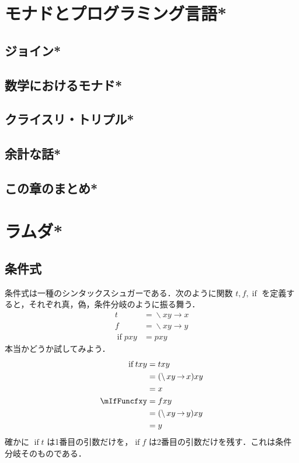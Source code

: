 \documentclass[a4paper,twocolumn]{jsbook}
\DeclareMathOperator{\mIfFunc}{if}
\DeclareMathOperator{\mLambda}{\backslash}
\DeclareMathOperator{\mLambdaArrow}{\rightarrow}
\newcommand{\mLambdaExp}[2]{\mLambda{#1}\mLambdaArrow{#2}}
\begin{document}


\chapter{モナドとプログラミング言語*}

\section{ジョイン*}

\section{数学におけるモナド*}

\section{クライスリ・トリプル*}

\section{余計な話*}

\section{この章のまとめ*}

\chapter{ラムダ*}

\section{条件式}

条件式は一種のシンタックスシュガーである．次のように関数 $t,f,\mIfFunc$ を定義すると，それぞれ真，偽，条件分岐のように振る舞う．
\begin{align}
t&=\mLambdaExp{xy}{x}\\
f&=\mLambdaExp{xy}{y}\\
\mIfFunc pxy&=pxy
\end{align}
本当かどうか試してみよう．
\begin{align}
\mIfFunc txy&=txy\\
&=(\mLambdaExp{xy}{x})xy\\
&=x\\
\mIfFuncfxy&=fxy\\
&=(\mLambdaExp{xy}{y})xy\\
&=y
\end{align}
確かに $\mIfFunc t$ は1番目の引数だけを，$\mIfFunc f$ は2番目の引数だけを残す．これは条件分岐そのものである．
\end{document}
